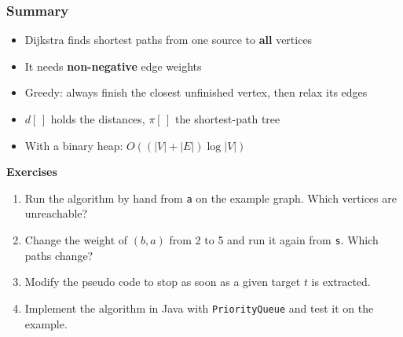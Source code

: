 \documentclass[aspectratio=169,10pt,compress]{beamer}
\begin{document}
\begin{frame}[t,fragile] \frametitle{Summary}
  \begin{itemize}
    \item Dijkstra finds shortest paths from one source to \textbf{all} vertices
    \item It needs \textbf{non-negative} edge weights
    \item Greedy: always finish the closest unfinished vertex, then relax its edges
    \item $d[\,]$ holds the distances, $\pi[\,]$ the shortest-path tree
    \item With a binary heap: $O((|V| + |E|) \log |V|)$
  \end{itemize}

  \vspace{0.5em}
  \textbf{Exercises}
  \begin{enumerate}\small
    \item Run the algorithm by hand from \texttt{a} on the example graph. Which vertices are unreachable?
    \item Change the weight of $(b, a)$ from 2 to 5 and run it again from \texttt{s}. Which paths change?
    \item Modify the pseudo code to stop as soon as a given target $t$ is extracted.
    \item Implement the algorithm in Java with \texttt{PriorityQueue} and test it on the example.
  \end{enumerate}
\end{frame}
\end{document}
